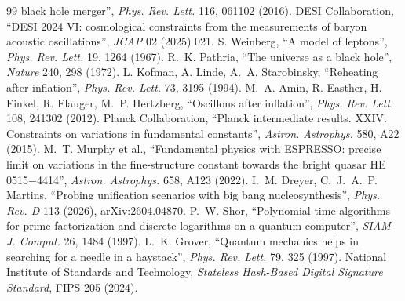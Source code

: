 \documentclass[11pt,a4paper]{article}
\theoremstyle{definition}
\theoremstyle{remark}
\begin{document}
\begin{thebibliography}{99}
black hole merger'', \emph{Phys. Rev. Lett.} 116, 061102 (2016).
 DESI Collaboration, ``DESI 2024 VI: cosmological constraints from the measurements of baryon acoustic oscillations'',
\emph{JCAP} 02 (2025) 021.
 S. Weinberg, ``A model of leptons'', \emph{Phys. Rev. Lett.} 19, 1264 (1967).
 R.~K. Pathria, ``The universe as a black hole'', \emph{Nature} 240, 298 (1972).
 L. Kofman, A. Linde, A.~A. Starobinsky, ``Reheating after inflation'', \emph{Phys. Rev. Lett.} 73, 3195 (1994).
 M.~A. Amin, R. Easther, H. Finkel, R. Flauger, M.~P. Hertzberg, ``Oscillons after inflation'', \emph{Phys. Rev.
Lett.} 108, 241302 (2012).
 Planck Collaboration, ``Planck intermediate results. XXIV. Constraints on variations in fundamental constants'',
\emph{Astron. Astrophys.} 580, A22 (2015).
 M.~T. Murphy et al., ``Fundamental physics with ESPRESSO: precise limit on variations in the fine-structure constant
towards the bright quasar HE 0515$-$4414'', \emph{Astron. Astrophys.} 658, A123 (2022).
 I.~M. Dreyer, C.~J.~A.~P. Martins, ``Probing unification scenarios with big bang nucleosynthesis'', \emph{Phys. Rev. D} 113
(2026), arXiv:2604.04870.
 P.~W. Shor, ``Polynomial-time algorithms for prime factorization and discrete logarithms on a quantum computer'',
\emph{SIAM J. Comput.} 26, 1484 (1997).
 L.~K. Grover, ``Quantum mechanics helps in searching for a needle in a haystack'', \emph{Phys. Rev. Lett.} 79, 325
(1997).
 National Institute of Standards and Technology, \emph{Stateless Hash-Based Digital Signature Standard}, FIPS 205
(2024).
\end{thebibliography}
\end{document}
